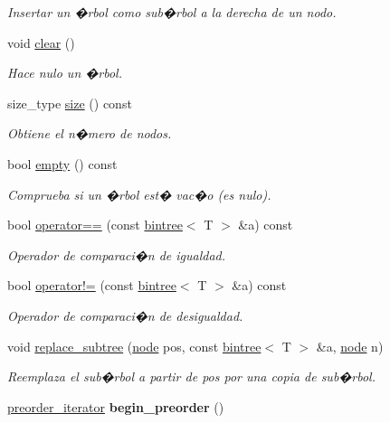 \begin{DoxyCompactItemize}
\begin{DoxyCompactList}\small\item\em Insertar un �rbol como sub�rbol a la derecha de un nodo. \end{DoxyCompactList}\item 
void \hyperlink{classbintree_a2078f7f9254a84b592fdb1f2e2f9238a}{clear} ()
\begin{DoxyCompactList}\small\item\em Hace nulo un �rbol. \end{DoxyCompactList}\item 
size\+\_\+type \hyperlink{classbintree_a05abb18037587082a67fb4d4d2f5733f}{size} () const 
\begin{DoxyCompactList}\small\item\em Obtiene el n�mero de nodos. \end{DoxyCompactList}\item 
bool \hyperlink{classbintree_a772126c3e8b7cd37e5a93ccbda01f8dd}{empty} () const 
\begin{DoxyCompactList}\small\item\em Comprueba si un �rbol est� vac�o (es nulo). \end{DoxyCompactList}\item 
bool \hyperlink{classbintree_a29438cd817b1d27ccc10d46676ba6bef}{operator==} (const \hyperlink{classbintree}{bintree}$<$ T $>$ \&a) const 
\begin{DoxyCompactList}\small\item\em Operador de comparaci�n de igualdad. \end{DoxyCompactList}\item 
bool \hyperlink{classbintree_a80e397f887ebad1ef974ec7722430a6c}{operator!=} (const \hyperlink{classbintree}{bintree}$<$ T $>$ \&a) const 
\begin{DoxyCompactList}\small\item\em Operador de comparaci�n de desigualdad. \end{DoxyCompactList}\item 
void \hyperlink{classbintree_a75647277e4d20981651450e86ffad165}{replace\+\_\+subtree} (\hyperlink{classbintree_1_1node}{node} pos, const \hyperlink{classbintree}{bintree}$<$ T $>$ \&a, \hyperlink{classbintree_1_1node}{node} n)
\begin{DoxyCompactList}\small\item\em Reemplaza el sub�rbol a partir de pos por una copia de sub�rbol. \end{DoxyCompactList}\item 
\hyperlink{classbintree_1_1preorder__iterator}{preorder\+\_\+iterator} {\bfseries begin\+\_\+preorder} ()\hypertarget{classbintree_aa03570e8e81b0f6e12a0901caa631973}{}\label{classbintree_aa03570e8e81b0f6e12a0901caa631973}


\end{DoxyCompactItemize}
